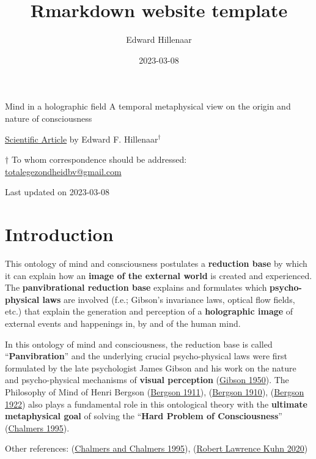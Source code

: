 \documentclass[
]{article}
\title{Rmarkdown website template}
\author{Edward Hillenaar}
\date{2023-03-08}
\begin{document}
\maketitle

Mind in a holographic field A temporal metaphysical view on the origin
and nature of consciousness

\href{https://github.com/EdwardHill15/rmarkdown_website_template}{Scientific
Article} by Edward F. Hillenaar\({^\dagger}\)

\({\dagger}\) To whom correspondence should be addressed:\\
\href{mailto:totalegezondheidbv@gmail.com}{totalegezondheidbv@gmail.com}

Last updated on 2023-03-08

\hypertarget{introduction}{%
\section{\texorpdfstring{\textbf{Introduction}}{Introduction}}\label{introduction}}

This ontology of mind and consciousness postulates a \textbf{reduction
base} by which it can explain how an \textbf{image of the external
world} is created and experienced. The \textbf{panvibrational reduction
base} explains and formulates which \textbf{psycho-physical laws} are
involved (f.e.; Gibson's invariance laws, optical flow fields, etc.)
that explain the generation and perception of a \textbf{holographic
image} of external events and happenings in, by and of the human mind.

In this ontology of mind and consciousness, the reduction base is called
``\textbf{Panvibration}'' and the underlying crucial psycho-physical
laws were first formulated by the late psychologist James Gibson and his
work on the nature and psycho-physical mechanisms of \textbf{visual
perception} (\protect\hyperlink{ref-Gibson1950}{Gibson 1950}). The
Philosophy of Mind of Henri Bergson
(\protect\hyperlink{ref-Bergson1911}{Bergson 1911}),
(\protect\hyperlink{ref-Bergson1910a}{Bergson 1910}),
(\protect\hyperlink{ref-Bergson1922}{Bergson 1922}) also plays a
fundamental role in this ontological theory with the \textbf{ultimate
metaphysical goal} of solving the ``\textbf{Hard Problem of
Consciousness}'' (\protect\hyperlink{ref-Chalmers1995}{Chalmers 1995}).

Other references: (\protect\hyperlink{ref-Chalmers1995a}{Chalmers and
Chalmers 1995}), (\protect\hyperlink{ref-RobertLawrenceKuhn2020}{Robert
Lawrence Kuhn 2020})
\end{document}
